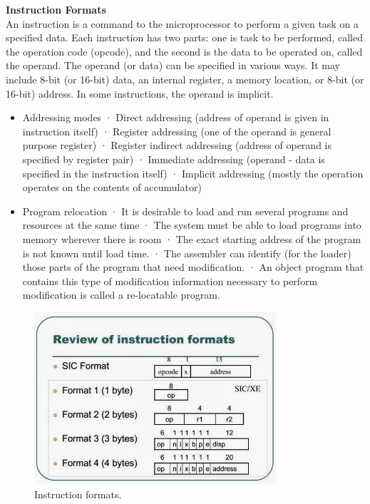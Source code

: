 \documentclass[12pt]{article}
\begin{document}
\textbf{Instruction Formats}\\
An instruction is a command to the microprocessor to perform a given task on a specified data. Each instruction has two parts: one is task to be performed, called the operation code (opcode), and the second is the data to be operated on, called the operand. The operand (or data) can be specified in various ways. It may include 8-bit (or 16-bit) data, an internal register, a memory location, or 8-bit (or 16-bit) address. In some instructions, the operand is implicit.\\
\begin{itemize}
  \item Addressing modes · Direct addressing (address of operand is given in instruction itself) · Register addressing (one of the operand is general purpose register) · Register indirect addressing (address of operand is specified by register pair) · Immediate addressing (operand - data is specified in the instruction itself) · Implicit addressing (mostly the operation operates on the contents of accumulator)
  \item Program relocation · It is desirable to load and run several programs and resources at the same time · The system must be able to load programs into memory wherever there is room · The exact starting address of the program is not known until load time. · The assembler can identify (for the loader) those parts of the program that need modification. · An object program that contains this type of modification information necessary to perform modification is called a re-locatable program.
\end{itemize}
\begin{figure}[!htb]
\centering
\includegraphics[width=0.8\textwidth]{instruction.jpeg}
\caption{\label{fig:instruction_format}Instruction formats.}
\end{figure}
\end{document}

